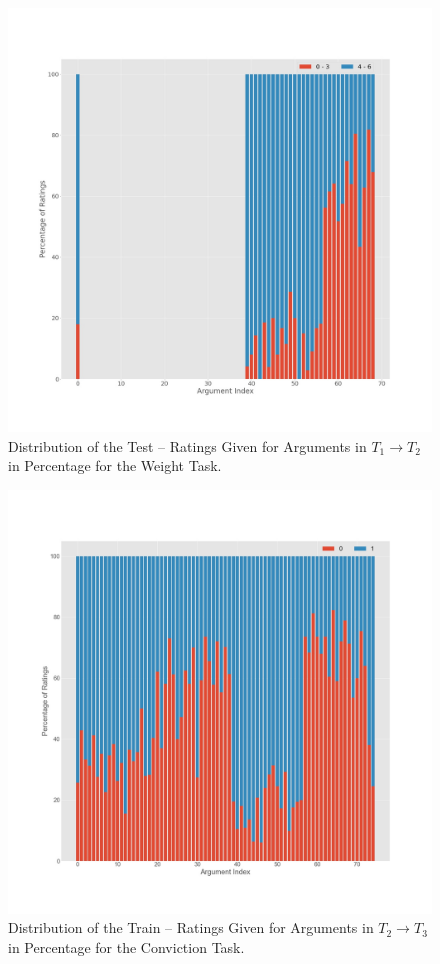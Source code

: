 \begin{figure}[!ht]
    \centering
    \includegraphics[width=1\textwidth]{images/T1_T2_test_Weight.jpg}
    \caption{Distribution of the Test – Ratings Given for Arguments in $T_1 \to T_2$ in Percentage for the Weight Task.}
    \label{fig:conviction_t2_t3_test}
\end{figure}

\begin{figure}[!ht]
    \centering
    \includegraphics[width=1\textwidth]{images/T2_T3_train_Conviction.jpg}
    \caption{Distribution of the Train – Ratings Given for Arguments in $T_2 \to T_3$ in Percentage for the Conviction Task.}
    \label{fig:conviction_t2_t3_train}
\end{figure}

